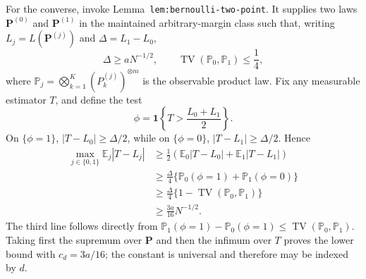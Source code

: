 For the converse, invoke Lemma~\texttt{lem:bernoulli-two-point}. It supplies two laws \(\mathbf P^{(0)}\) and \(\mathbf P^{(1)}\) in the maintained arbitrary-margin class such that, writing \(L_j=L(\mathbf P^{(j)})\) and \(\Delta=L_1-L_0\),
\[
\Delta\ge aN^{-1/2},
\qquad
\operatorname{TV}(\mathbb P_0,\mathbb P_1)\le\frac14,
\tag{2}
\]
where \(\mathbb P_j=\bigotimes_{k=1}^K(P_k^{(j)})^{\otimes m}\) is the observable product law. Fix any measurable estimator \(T\), and define the test
\[
\phi=\mathbf 1\left\{T>\frac{L_0+L_1}{2}\right\}.
\]
On \(\{\phi=1\}\), \(|T-L_0|\ge\Delta/2\), while on \(\{\phi=0\}\), \(|T-L_1|\ge\Delta/2\). Hence
\[
\begin{aligned}
\max_{j\in\{0,1\}}\mathbb E_j|T-L_j|
&\ge \frac12\left(\mathbb E_0|T-L_0|+\mathbb E_1|T-L_1|\right)\\
&\ge \frac{\Delta}{4}\{\mathbb P_0(\phi=1)+\mathbb P_1(\phi=0)\}\\
&\ge \frac{\Delta}{4}\{1-\operatorname{TV}(\mathbb P_0,\mathbb P_1)\}\\
&\ge \frac{3a}{16}N^{-1/2}.
\end{aligned}
\tag{3}
\]
The third line follows directly from \(\mathbb P_1(\phi=1)-\mathbb P_0(\phi=1)\le\operatorname{TV}(\mathbb P_0,\mathbb P_1)\). Taking first the supremum over \(\mathbf P\) and then the infimum over \(T\) proves the lower bound with \(c_d=3a/16\); the constant is universal and therefore may be indexed by \(d\).

